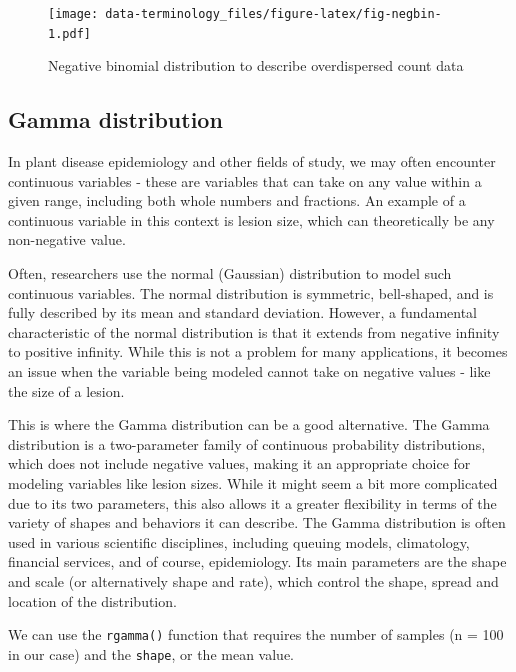 \documentclass[
  letterpaper,
]{book}
\begin{document}
\begin{figure}

{\centering \texttt{[image: data-terminology\_files/figure-latex/fig-negbin-1.pdf]}

}

\caption{\label{fig-negbin}Negative binomial distribution to describe
overdispersed count data}

\end{figure}

\hypertarget{gamma-distribution}{%
\subsection{Gamma distribution}\label{gamma-distribution}}

In plant disease epidemiology and other fields of study, we may often
encounter continuous variables - these are variables that can take on
any value within a given range, including both whole numbers and
fractions. An example of a continuous variable in this context is lesion
size, which can theoretically be any non-negative value.

Often, researchers use the normal (Gaussian) distribution to model such
continuous variables. The normal distribution is symmetric, bell-shaped,
and is fully described by its mean and standard deviation. However, a
fundamental characteristic of the normal distribution is that it extends
from negative infinity to positive infinity. While this is not a problem
for many applications, it becomes an issue when the variable being
modeled cannot take on negative values - like the size of a lesion.

This is where the Gamma distribution can be a good alternative. The
Gamma distribution is a two-parameter family of continuous probability
distributions, which does not include negative values, making it an
appropriate choice for modeling variables like lesion sizes. While it
might seem a bit more complicated due to its two parameters, this also
allows it a greater flexibility in terms of the variety of shapes and
behaviors it can describe. The Gamma distribution is often used in
various scientific disciplines, including queuing models, climatology,
financial services, and of course, epidemiology. Its main parameters are
the shape and scale (or alternatively shape and rate), which control the
shape, spread and location of the distribution.

We can use the \texttt{rgamma()} function that requires the number of
samples (n = 100 in our case) and the \texttt{shape}, or the mean value.
\end{document}
